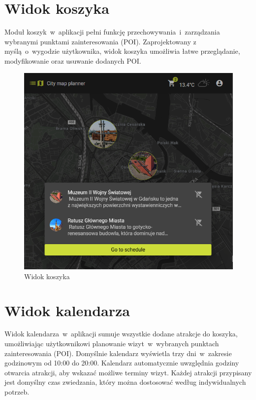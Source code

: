 \section{Widok koszyka}
\label{sec:koszyk}

Moduł koszyk~w~aplikacji pełni funkcję przechowywania~i~zarządzania wybranymi punktami zainteresowania (POI).
Zaprojektowany z myślą~o~wygodzie użytkownika, widok koszyka umożliwia łatwe przeglądanie, modyfikowanie oraz usuwanie dodanych POI.

    \begin{figure}[H]
        \centering
        \includegraphics[width=1\textwidth]{attachments/koszyk}
        \caption{Widok koszyka}
        \label{fig:koszyk}
\end{figure}

\section{Widok kalendarza}
\label{sec:kalendarz}
Widok kalendarza~w~aplikacji sumuje wszystkie dodane atrakcje do koszyka, umożliwiając użytkownikowi planowanie wizyt~w~wybranych punktach zainteresowania (POI).
Domyślnie kalendarz wyświetla trzy dni~w~zakresie godzinowym od 10:00 do 20:00.
Kalendarz automatycznie uwzględnia godziny otwarcia atrakcji, aby wskazać możliwe terminy wizyt.
Każdej atrakcji przypisany jest domyślny czas zwiedzania, który można dostosować według indywidualnych potrzeb.



